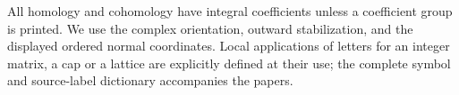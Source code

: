 All homology and cohomology have integral coefficients unless a coefficient
group is printed. We use the complex orientation, outward stabilization,
and the displayed ordered normal coordinates. Local applications of letters
for an integer matrix, a cap or a lattice are explicitly defined at their
use; the complete symbol and source-label dictionary accompanies the papers.

